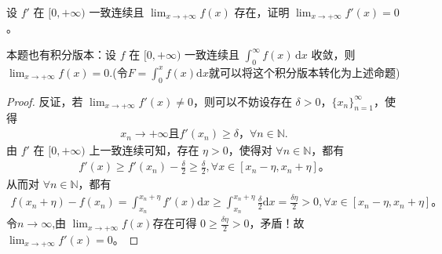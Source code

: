 \documentclass[../../main.tex]{subfiles}
\begin{document}
\begin{proposition}\label{proposition:经典导数一致连续问题}
设 $f'$ 在 $[0,+\infty)$ 一致连续且 $\lim_{x \to +\infty} f(x)$ 存在，证明 $\lim_{x \to +\infty} f'(x) = 0$。
\end{proposition}
\begin{note}
本题也有积分版本：设 $f$ 在 $[0,+\infty)$ 一致连续且 $\int_{0}^{\infty} f(x) \, \mathrm{d}x$ 收敛，则 $\lim_{x \to +\infty} f(x) = 0$.(令$F=\int_0^x{f\left( x \right) \mathrm{d}x}$就可以将这个积分版本转化为上述命题)
\end{note}
\begin{proof}
反证，若 $\lim_{x\rightarrow +\infty} f'(x) \ne 0$，则可以不妨设存在 $\delta >0$，$\{ x_n \}_{n=1}^{\infty}$，使得
\begin{align*}
x_n\rightarrow +\infty \text{且} f'(x_n) \geqslant \delta，\forall n\in \mathbb{N}.    
\end{align*}
由 $f'$ 在 $[0,+\infty)$ 上一致连续可知，存在 $\eta >0$，使得对 $\forall n\in \mathbb{N}$，都有
\begin{align*}
f'(x) \geqslant f'(x_n) -\frac{\delta}{2} \geqslant \frac{\delta}{2}, \forall x\in [x_n-\eta ,x_n+\eta] 。
\end{align*}
从而对 $\forall n\in \mathbb{N}$，都有
\begin{align*}
f(x_n+\eta) -f(x_n) =\int_{x_n}^{x_n+\eta} f'(x) \mathrm{d}x \geqslant \int_{x_n}^{x_n+\eta} \frac{\delta}{2} \mathrm{d}x = \frac{\delta \eta}{2} > 0, \forall x\in [x_n-\eta ,x_n+\eta] 。
\end{align*}
令$n\rightarrow \infty$,由 $\lim_{x\rightarrow +\infty} f(x) $存在可得 $0 \geqslant \frac{\delta \eta}{2} > 0$，矛盾！故 $\lim_{x\rightarrow +\infty} f'(x) =0$。
\end{proof}
\end{document}
